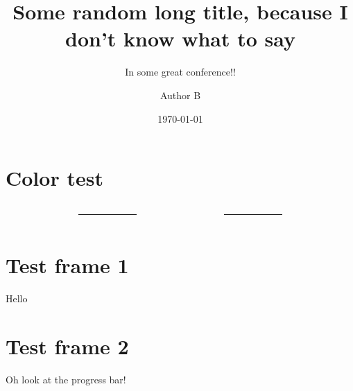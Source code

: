 \documentclass[%
    listings={
        Lean=listings-lean,
        Go
    },
	withappendix,
]{rainbow-beamer}
\title[Short title]{Some random long title, because I don't know what to say}
\subtitle{In some great conference!!}
\author[\speaker{A} \and B]{\speaker{Speaker A}\and Author B}
\date{\today}
\begin{document}
\section{Color test}
\begin{sframe}
	\footnotesize
	\sffamily
	\begin{columns}
		\begin{column}{.27\linewidth}
			\begin{testcolors}[HTML]
			\end{testcolors}
		\end{column}
		\begin{column}{.05\linewidth}
			\centering
			\rule{.1mm}{.7\textheight}
		\end{column}
		\begin{column}{.27\linewidth}
			\begin{testcolors}[HTML]
			\end{testcolors}
		\end{column}
		\begin{column}{.05\linewidth}
			\centering
			\rule{.1mm}{.7\textheight}
		\end{column}
		\begin{column}{.27\linewidth}
			\begin{testcolors}[HTML]
			\end{testcolors}
		\end{column}
	\end{columns}
\end{sframe}

\section{Test frame 1}
\begin{sframe}
	Hello
\end{sframe}

\section{Test frame 2}
\begin{sframe}
	Oh look at the progress bar!
\end{sframe}
\end{document}
